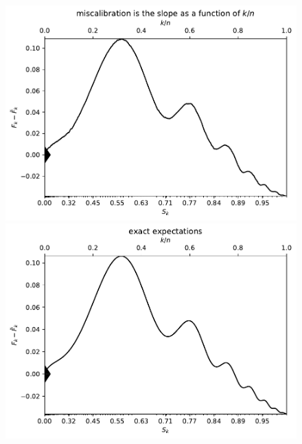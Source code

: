 \documentclass{article}
\begin{document}
\begin{figure}
\begin{centering}

\parbox{\imsize}{\includegraphics[width=\imsize]
                {./codes/unweighted/10000_10_2_1/cumulative.pdf}}
\quad\quad
\parbox{\imsize}{\includegraphics[width=\imsize]
                {./codes/unweighted/10000_10_2_1/cumulative_exact.pdf}}

\vspace{\vertsep}


\end{centering}
\end{figure}
\end{document}
